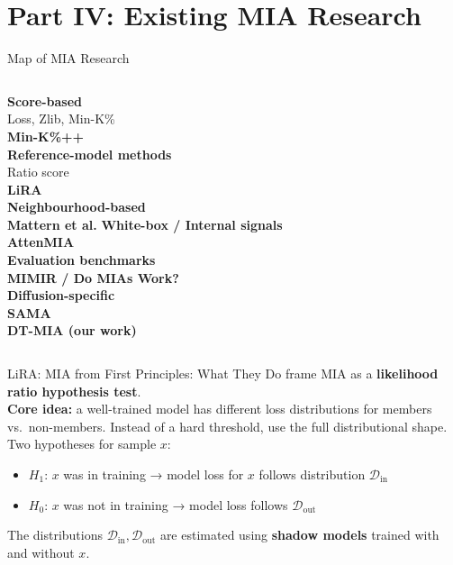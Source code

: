 \documentclass[10pt, aspectratio=169]{beamer}
\begin{document}
\section{Part IV: Existing MIA Research}

\begin{frame}{Map of MIA Research}
  \begin{columns}[T]
    \textbf{Score-based}\\
    \quad Loss, Zlib, Min-K\% \\
    \quad \textbf{Min-K\%++} \citep{zhang2024mink}\\[6pt]
    \textbf{Reference-model methods}\\
    \quad Ratio score\\
    \quad \textbf{LiRA} \citep{carlini2022membership}\\[6pt]
    \textbf{Neighbourhood-based}\\
    \quad \textbf{Mattern et al.} \citep{mattern2023mia}
    \textbf{White-box / Internal signals}\\
    \quad \textbf{AttenMIA} \citep{zaree2026attenmia}\\[6pt]
    \textbf{Evaluation benchmarks}\\
    \quad \textbf{MIMIR / Do MIAs Work?} \citep{duan2024mimir}\\[6pt]
    \textbf{Diffusion-specific}\\
    \quad \textbf{SAMA} \citep{shi2025sama}\\
    \quad \textbf{DT-MIA (our work)}
  \end{columns}
\end{frame}


\begin{frame}{LiRA: MIA from First Principles: What They Do}
  \citet{carlini2022membership} frame MIA as a \textbf{likelihood ratio hypothesis test}.\\[8pt]
  \textbf{Core idea:} a well-trained model has different loss distributions for members vs.\ non-members.
  Instead of a hard threshold, use the full distributional shape.\\[8pt]
  Two hypotheses for sample $x$:
  \begin{itemize}
    \item $H_1$: $x$ was in training → model loss for $x$ follows distribution $\mathcal{D}_{\mathrm{in}}$
    \item $H_0$: $x$ was not in training → model loss follows $\mathcal{D}_{\mathrm{out}}$
  \end{itemize}
  \vspace{6pt}
  The distributions $\mathcal{D}_{\mathrm{in}}, \mathcal{D}_{\mathrm{out}}$ are estimated using \textbf{shadow models} trained with and without $x$.
\end{frame}
\end{document}
